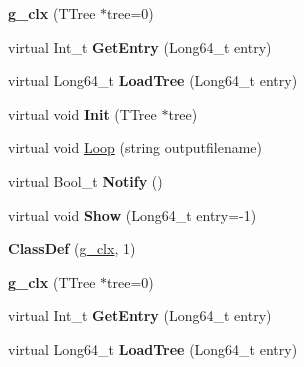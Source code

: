\begin{DoxyCompactItemize}
\item 
\mbox{\label{classg__clx_aa619daf508fe1d6bddb000af26630f31}} 
{\bfseries g\+\_\+clx} (T\+Tree $\ast$tree=0)
\item 
\mbox{\label{classg__clx_ab4c53e12e70c3671ff8895fc388dd7d2}} 
virtual Int\+\_\+t {\bfseries Get\+Entry} (Long64\+\_\+t entry)
\item 
\mbox{\label{classg__clx_a0aab3745bdb3db08757c974eebffbe39}} 
virtual Long64\+\_\+t {\bfseries Load\+Tree} (Long64\+\_\+t entry)
\item 
\mbox{\label{classg__clx_a92531261155ea15bee6b74c7e491132a}} 
virtual void {\bfseries Init} (T\+Tree $\ast$tree)
\item 
virtual void \hyperlink{classg__clx_a9d5de859df4bfbb746726661ff1d24a9}{Loop} (string outputfilename)
\item 
\mbox{\label{classg__clx_a1fe81316168bc18dc2325ca5595577a9}} 
virtual Bool\+\_\+t {\bfseries Notify} ()
\item 
\mbox{\label{classg__clx_ae86183470c7bb8db45753aa4c86f1d41}} 
virtual void {\bfseries Show} (Long64\+\_\+t entry=-\/1)
\item 
\mbox{\label{classg__clx_a8d0a8ed3a7cc55ca97aeb77f4183d3b8}} 
{\bfseries Class\+Def} (\hyperlink{classg__clx}{g\+\_\+clx}, 1)
\item 
\mbox{\label{classg__clx_aa619daf508fe1d6bddb000af26630f31}} 
{\bfseries g\+\_\+clx} (T\+Tree $\ast$tree=0)
\item 
\mbox{\label{classg__clx_ab4c53e12e70c3671ff8895fc388dd7d2}} 
virtual Int\+\_\+t {\bfseries Get\+Entry} (Long64\+\_\+t entry)
\item 
\mbox{\label{classg__clx_a0aab3745bdb3db08757c974eebffbe39}} 
virtual Long64\+\_\+t {\bfseries Load\+Tree} (Long64\+\_\+t entry)
\item 
\mbox{\label{classg__clx_a92531261155ea15bee6b74c7e491132a}} 

\end{DoxyCompactItemize}
